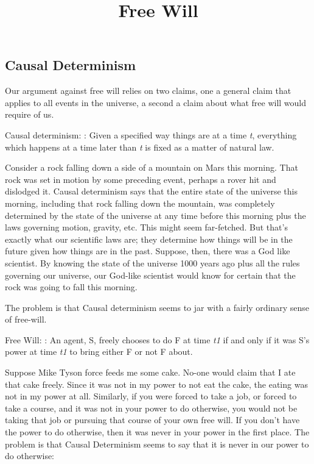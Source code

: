 \documentclass[]{article}
\title{Free Will}
\date{}
\begin{document}
\maketitle

\subsection{Causal Determinism}\label{causal-determinism}

Our argument against free will relies on two claims, one a general claim
that applies to all events in the universe, a second a claim about what
free will would require of us.

Causal determinism: : Given a specified way things are at a time
\emph{t}, everything which happens at a time later than \emph{t} is
fixed as a matter of natural law.

Consider a rock falling down a side of a mountain on Mars this morning.
That rock was set in motion by some preceding event, perhaps a rover hit
and dislodged it. Causal determinism says that the entire state of the
universe this morning, including that rock falling down the mountain,
was completely determined by the state of the universe at any time
before this morning plus the laws governing motion, gravity, etc. This
might seem far-fetched. But that's exactly what our scientific laws are;
they determine how things will be in the future given how things are in
the past. Suppose, then, there was a God like scientist. By knowing the
state of the universe 1000 years ago plus all the rules governing our
universe, our God-like scientist would know for certain that the rock
was going to fall this morning.

The problem is that Causal determinism seems to jar with a fairly
ordinary sense of free-will.

Free Will: : An agent, S, freely chooses to do F at time \emph{t1} if
and only if it was S's power at time \emph{t1} to bring either F or not
F about.

Suppose Mike Tyson force feeds me some cake. No-one would claim that I
ate that cake freely. Since it was not in my power to not eat the cake,
the eating was not in my power at all. Similarly, if you were forced to
take a job, or forced to take a course, and it was not in your power to
do otherwise, you would not be taking that job or pursuing that course
of your own free will. If you don't have the power to do otherwise, then
it was never in your power in the first place. The problem is that
Causal Determinism seems to say that it is never in our power to do
otherwise:
\end{document}

